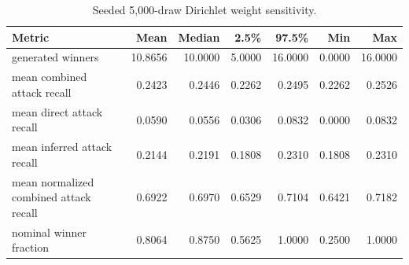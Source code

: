 \begin{table}[tb]
\centering
\caption{Seeded 5,000-draw Dirichlet weight sensitivity.}
\label{tab:corrected_weight_sensitivity}
\begin{tabular}{lrrrrrr}
\toprule
Metric & Mean & Median & 2.5\% & 97.5\% & Min & Max \\
\midrule
generated winners & 10.8656 & 10.0000 & 5.0000 & 16.0000 & 0.0000 & 16.0000 \\
mean combined attack recall & 0.2423 & 0.2446 & 0.2262 & 0.2495 & 0.2262 & 0.2526 \\
mean direct attack recall & 0.0590 & 0.0556 & 0.0306 & 0.0832 & 0.0000 & 0.0832 \\
mean inferred attack recall & 0.2144 & 0.2191 & 0.1808 & 0.2310 & 0.1808 & 0.2310 \\
mean normalized combined attack recall & 0.6922 & 0.6970 & 0.6529 & 0.7104 & 0.6421 & 0.7182 \\
nominal winner fraction & 0.8064 & 0.8750 & 0.5625 & 1.0000 & 0.2500 & 1.0000 \\
\bottomrule
\end{tabular}
\end{table}

